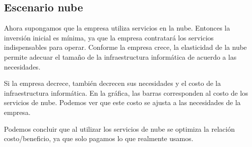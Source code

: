 \subsection{Escenario nube}

Ahora supongamos que la empresa utiliza servicios en la nube. Entonces la inversión inicial es mínima, ya que la empresa contratará los servicios indispensables para operar. Conforme la empresa crece, la elasticidad de la nube permite adecuar el tamaño de la infraestructura informática de acuerdo a las necesidades.

Si la empresa decrece, también decrecen sus necesidades y el costo de la infraestructura informática. En la gráfica, las barras corresponden al costo de los servicios de nube. Podemos ver que este costo se ajusta a las necesidades de la empresa.

Podemos concluir que al utilizar los servicios de nube se optimiza la relación costo/beneficio, ya que solo pagamos lo que realmente usamos.
